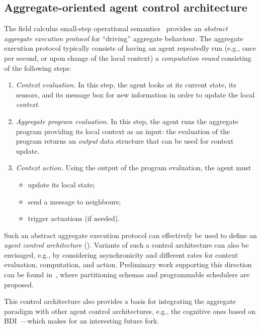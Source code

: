 \subsection{Aggregate-oriented agent control architecture}
\label{contrib-ac-control-arch}

%
The field calculus small-step operational semantics~\cite{audrito2019tocl}
 provides an \emph{abstract aggregate execution protocol}
 for ``driving'' aggregate behaviour.
%
The aggregate execution protocol typically consists
 of having an agent repeatedly run (e.g., once per second, or upon change of the local context) 
 a \emph{computation round} consisting of the following steps:
%
\begin{enumerate}
\item \emph{Context evaluation.} In this step, 
 the agent looks at its current state,
 its sensors,
 and its message box
 for new information
 in order to update the local \emph{context}.
\item \emph{Aggregate program evaluation.}
 In this step,
 the agent runs the aggregate program
 providing its local context as an input:
 the evaluation of the program returns 
 an \emph{output} data structure
 that can be used for context update.
\item \emph{Context action.} Using the output of the program evaluation,
 the agent must
 \begin{itemize}
 \item update its local state;
 \item send a message to neighbours;
 \item trigger actuations (if needed).
 \end{itemize}
\end{enumerate}

Such an abstract aggregate execution protocol %
 can effectively be used to define an \emph{agent control architecture} ().
%
Variants of such a control architecture can also be envisaged,
 e.g.,
 by considering 
 asynchronicity and  
 different rates for context evaluation,
 computation,
 and action.
%
Preliminary work supporting this direction can be found in~\cite{DBLP:journals/fi/CasadeiPPVW20,DBLP:journals/corr/abs-2012-13806},
 where partitioning schemas and programmable schedulers are proposed.

This control architecture also provides a basis for integrating the aggregate paradigm 
 with other agent control architectures, e.g., the cognitive ones based on BDI~\cite{desilva2020bdi}---which makes for an interesting future fork.



